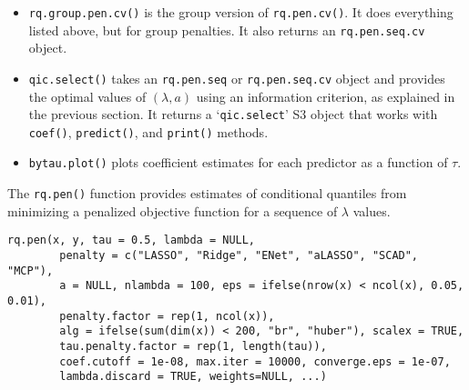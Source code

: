 \begin{itemize}
\item
  \texttt{rq.group.pen.cv()} is the group version of \texttt{rq.pen.cv()}. It does everything listed above, but for group penalties. It also returns an \texttt{rq.pen.seq.cv} object.
\item
  \texttt{qic.select()} takes an \texttt{rq.pen.seq} or \texttt{rq.pen.seq.cv} object and provides the optimal values of \((\lambda,a)\) using an information criterion, as explained in the previous section. It returns a `\texttt{qic.select}' S3 object that works with \texttt{coef()}, \texttt{predict()}, and \texttt{print()} methods.
\item
  \texttt{bytau.plot()} plots coefficient estimates for each predictor as a function of \(\tau\).
\end{itemize}

The \texttt{rq.pen()} function provides estimates of conditional quantiles from minimizing a penalized objective function for a sequence of \(\lambda\) values.

\begin{verbatim}
rq.pen(x, y, tau = 0.5, lambda = NULL,
        penalty = c("LASSO", "Ridge", "ENet", "aLASSO", "SCAD", "MCP"),
        a = NULL, nlambda = 100, eps = ifelse(nrow(x) < ncol(x), 0.05, 0.01),
        penalty.factor = rep(1, ncol(x)),
        alg = ifelse(sum(dim(x)) < 200, "br", "huber"), scalex = TRUE,
        tau.penalty.factor = rep(1, length(tau)),
        coef.cutoff = 1e-08, max.iter = 10000, converge.eps = 1e-07,
        lambda.discard = TRUE, weights=NULL, ...)
\end{verbatim}

